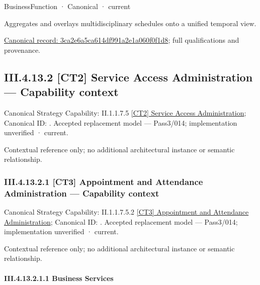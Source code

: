 \label{element:3ca2e6a5ca614df991a2e1a060f0f1d8}
{\small BusinessFunction · Canonical · current}\par

Aggregates and overlays multidisciplinary schedules onto a unified temporal view.


{\footnotesize \href{../../../../continuum/business/business-function/3ca2e6a5ca614df991a2e1a060f0f1d8.md}{Canonical record: 3ca2e6a5ca614df991a2e1a060f0f1d8}; full qualifications and provenance.}\par
\subsection*{III.4.13.2 [CT2] Service Access Administration — Capability context}
\label{navigation:III.4.13.2}

{\small Canonical Strategy Capability: II.1.1.7.5 \hyperref[element:ba82c985e20a4f9382e7e265a19e440e]{[CT2] Service Access Administration}; Canonical ID: \texttt{}. Accepted replacement model — Pass3/014; implementation unverified · current.}\par
Contextual reference only; no additional architectural instance or semantic relationship.\par
\subsubsection*{III.4.13.2.1 [CT3] Appointment and Attendance Administration — Capability context}
\label{navigation:III.4.13.2.1}

{\small Canonical Strategy Capability: II.1.1.7.5.2 \hyperref[element:cd330c1c71f14310a765d0cb46e6f208]{[CT3] Appointment and Attendance Administration}; Canonical ID: \texttt{}. Accepted replacement model — Pass3/014; implementation unverified · current.}\par
Contextual reference only; no additional architectural instance or semantic relationship.\par
\paragraph*{III.4.13.2.1.1 Business Services}
\label{navigation:III.4.13.2.1.1}

